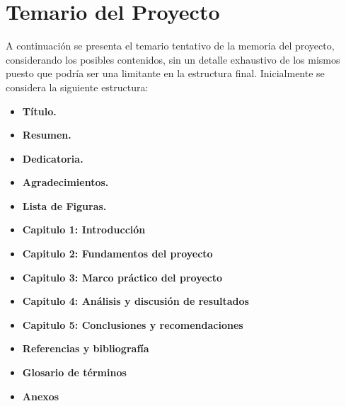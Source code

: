 \documentclass[12pt,letterpaper]{article}
\begin{document}



\section{Temario del Proyecto}
A continuación se presenta el temario tentativo de la memoria del proyecto, 
considerando los posibles contenidos, sin un detalle exhaustivo de los mismos 
puesto que podría ser una limitante en la estructura final. 
Inicialmente se considera la siguiente estructura:\\

\begin{itemize}

\item \textbf{Título.}

\item \textbf{Resumen.}

\item \textbf{Dedicatoria.}

\item \textbf{Agradecimientos.}

\item \textbf{Lista de Figuras.}

\item \textbf{Capitulo 1: Introducción}  

\item \textbf{Capitulo 2: Fundamentos del proyecto}  

\item \textbf{Capitulo 3: Marco práctico del proyecto} 

\item \textbf{Capitulo 4: Análisis y discusión de resultados}

\item \textbf{Capitulo 5: Conclusiones y recomendaciones}

\item \textbf{Referencias y bibliografía}

\item \textbf{Glosario de términos}

\item \textbf{Anexos}
\end{itemize}
\end{document}
